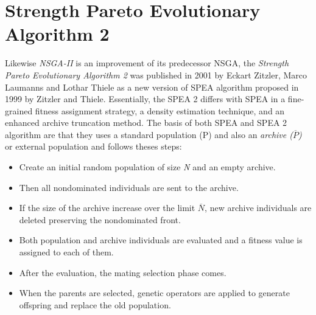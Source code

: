 \section{Strength Pareto Evolutionary Algorithm 2}
Likewise \textit{NSGA-II} is an improvement of its predecessor NSGA, the \textit{Strength Pareto Evolutionary Algorithm 2} was published in 2001 by Eckart Zitzler, Marco Laumanns and Lothar Thiele as a new version of SPEA algorithm proposed in 1999 by Zitzler and Thiele\cite{SPEA2}. Essentially, the SPEA 2 differs with SPEA in a fine-grained fitness assignment strategy, a density estimation technique, and an enhanced archive truncation method\cite{SPEA2}.
The basis of both SPEA and SPEA 2 algorithm are that they uses a standard population (P) and also an \textit{archive ($\overline{P}$)} or external population and follows theses steps:
\begin{itemize}
    \item Create an initial random population of size \textit{N} and an empty archive.
    \item Then all nondominated individuals are sent to the archive.
    \item If the size of the archive increase over the limit $\overline{N}$, new archive individuals are deleted preserving the nondominated front.
    \item Both population and archive individuals are evaluated and a fitness value is assigned to each of them.
    \item After the evaluation, the mating selection phase comes.
    \item When the parents are selected, genetic operators are applied to generate offspring and replace the old population.
\end{itemize}

